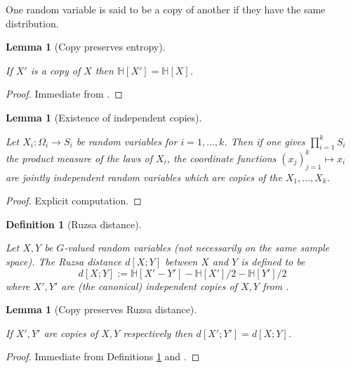 \documentclass[10pt,a4paper]{article}
\newtheorem{lemma}[theorem]{Lemma}
\newtheorem{definition}[theorem]{Definition}
\newcommand{\lean}[1]{}
\newcommand{\uses}[1]{}
\newcommand{\leanok}{}
\newcommand{\bbH}{\mathbb{H}}
\begin{document}
One random variable is said to be a copy of another if they have the same distribution.

\begin{lemma}[Copy preserves entropy]\label{copy-ent}
  \uses{entropy-def}
  \lean{ProbabilityTheory.IdentDistrib.entropy_congr}\leanok
  If $X'$ is a copy of $X$ then $\bbH[X'] = \bbH[X]$.
\end{lemma}

\begin{proof}\leanok Immediate from .
\end{proof}

\begin{lemma}[Existence of independent copies]\label{independent-exist}
  \uses{independent-def}
  \lean{ProbabilityTheory.independent_copies, ProbabilityTheory.independent_copies', ProbabilityTheory.independent_copies_two, ProbabilityTheory.independent_copies3_nondep} \leanok
  Let $X_i : \Omega_i \to S_i$ be random variables for $i=1,\dots,k$.  Then if one gives $\prod_{i=1}^k S_i$ the product measure of the laws of $X_i$, the coordinate functions $(x_j)_{j=1}^k \mapsto x_i$ are jointly independent random variables which are copies of the $X_1,\dots,X_k$.
\end{lemma}

\begin{proof} \leanok
  Explicit computation.
\end{proof}

\begin{definition}[Ruzsa distance]\label{ruz-dist-def}
  \uses{entropy-def, independent-exist}
  \lean{rdist_def}\leanok
  Let $X,Y$ be $G$-valued random variables (not necessarily on the same sample space).  The \emph{Ruzsa distance} $d[X ;Y]$ between $X$ and $Y$ is defined to be
$$ d[X ;Y] := \bbH[X' - Y'] - \bbH[X']/2 - \bbH[Y']/2$$
where $X',Y'$ are (the canonical) independent copies of $X,Y$ from .
\end{definition}


\begin{lemma}[Copy preserves Ruzsa distance]\label{ruz-copy}
  \uses{ruz-dist-def}
  \lean{ProbabilityTheory.IdentDistrib.rdist_congr}\leanok
  If $X',Y'$ are copies of $X,Y$ respectively then $d[X';Y']=d[X ;Y]$.
\end{lemma}

\begin{proof} \uses{copy-ent}\leanok Immediate from Definitions \ref{ruz-dist-def} and .
\end{proof}
\end{document}
